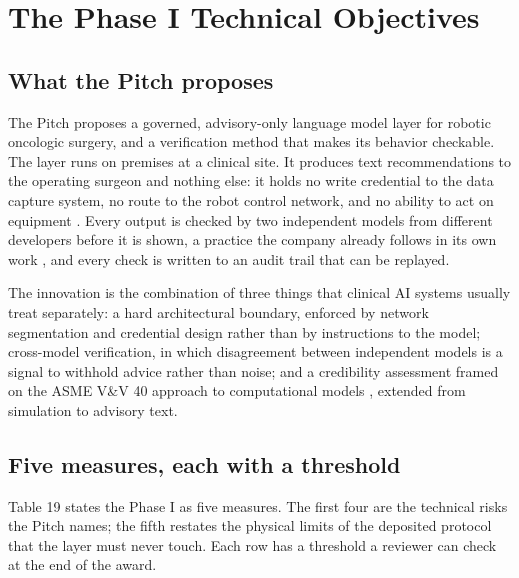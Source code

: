 \section{The Phase I Technical Objectives}

\subsection{What the Pitch proposes}

The Pitch proposes a governed, advisory-only language model layer for robotic
oncologic surgery, and a verification method that makes its behavior checkable.
The layer runs on premises at a clinical site. It produces text recommendations
to the operating surgeon and nothing else: it holds no write credential to the
data capture system, no route to the robot control network, and no ability to
act on equipment \cite{onpremwhippl,phase1ind}. Every output is checked by two
independent models from different developers before it is shown, a practice the
company already follows in its own work \cite{tripartisan2026}, and every check
is written to an audit trail that can be replayed.

The innovation is the combination of three things that clinical AI systems
usually treat separately: a hard architectural boundary, enforced by network
segmentation and credential design rather than by instructions to the model;
cross-model verification, in which disagreement between independent models is a
signal to withhold advice rather than noise; and a credibility assessment framed
on the ASME V\&V 40 approach to computational models \cite{asmevv40}, extended
from simulation to advisory text.

\subsection{Five measures, each with a threshold}

Table 19 states the Phase I as five measures. The first four are the technical
risks the Pitch names; the fifth restates the physical limits of the deposited
protocol that the layer must never touch. Each row has a threshold a reviewer
can check at the end of the award.

